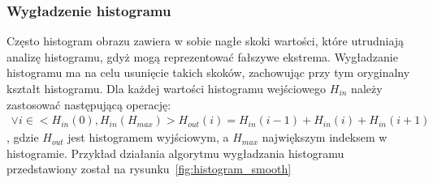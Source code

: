 \subsubsection{Wygładzenie histogramu}
Często histogram obrazu zawiera w sobie nagłe skoki wartości, które utrudniają analizę histogramu, gdyż mogą reprezentować fałszywe ekstrema. Wygładzanie histogramu ma na celu usunięcie takich skoków, zachowując przy tym oryginalny kształt histogramu. Dla każdej wartości histogramu wejściowego \textit{$H_{in}$} należy zastosować następującą operację:
\begin{gather*}
  \vee i \in <H_{in}(0), H_{in}(H_{max})> H_{out}(i) = H_{in}(i-1) + H_{in}(i) + H_{in}(i+1)
\end{gather*},
gdzie \textit{$H_{out}$} jest histogramem wyjściowym, a $H_{max}$ największym indeksem w histogramie. Przykład działania algorytmu wygładzania histogramu przedstawiony został na rysunku~\ref{fig:histogram_smooth}
